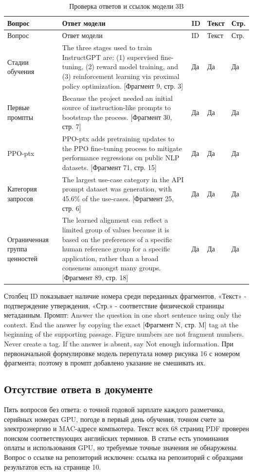 \documentclass[12pt,a4paper]{article}
\begin{document}
{\small\begin{longtable}{L{3.0cm}L{7.0cm}L{1.0cm}L{1.2cm}L{1.0cm}}
\caption{Проверка ответов и ссылок модели 3B}\\\toprule
Вопрос & Ответ модели & ID & Текст & Стр.\\\midrule\endfirsthead
\toprule Вопрос & Ответ модели & ID & Текст & Стр.\\\midrule\endhead
Стадии обучения & The three stages used to train InstructGPT are: (1) supervised fine-tuning, (2) reward model training, and (3) reinforcement learning via proximal policy optimization. [Фрагмент 9, стр. 3] & Да & Да & Да\\
Первые промпты & Because the project needed an initial source of instruction-like prompts to bootstrap the process. [Фрагмент 30, стр. 7] & Да & Да & Да\\
PPO-ptx & PPO-ptx adds pretraining updates to the PPO fine-tuning process to mitigate performance regressions on public NLP datasets. [Фрагмент 71, стр. 15] & Да & Да & Да\\
Категория запросов & The largest use-case category in the API prompt dataset was generation, with 45.6\% of the use-cases. [Фрагмент 25, стр. 6] & Да & Да & Да\\
Ограниченная группа ценностей & The learned alignment can reflect a limited group of values because it is based on the preferences of a specific human reference group for a specific application, rather than a broad consensus amongst many groups. [Фрагмент 89, стр. 18] & Да & Да & Да\\\bottomrule
\end{longtable}}
Столбец ID показывает наличие номера среди переданных фрагментов, «Текст» - подтверждение утверждения, «Стр.» - соответствие физической страницы метаданным. Промпт: Answer the question in one short sentence using only the context. End the answer by copying the exact [Фрагмент N, стр. M] tag at the beginning of the supporting passage. Figure numbers are not fragment numbers. Never create a tag. If the answer is absent, say Not enough information. При первоначальной формулировке модель перепутала номер рисунка 16 с номером фрагмента; поэтому в промпт добавлено указание не смешивать их.

\subsection{Отсутствие ответа в документе}
Пять вопросов без ответа: о точной годовой зарплате каждого разметчика, серийных номерах GPU, погоде в первый день обучения, точном счете за электроэнергию и MAC-адресе компьютера. Текст всех 68 страниц PDF проверен поиском соответствующих английских терминов. В статье есть упоминания оплаты и использования GPU, но требуемые точные значения не обнаружены. Вопрос о ссылке на репозиторий исключен: ссылка на репозиторий с образцами результатов есть на странице 10.
\end{document}
